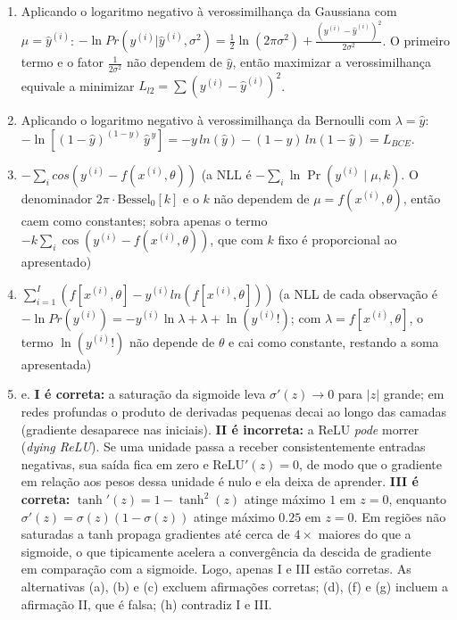 \documentclass{dlproblemset}
\begin{document}
\begin{enumerate}[1)]
    \item Aplicando o logaritmo negativo à verossimilhança da Gaussiana com $\mu = \hat{y}^{(i)}$: $-\ln Pr(y^{(i)}|\hat{y}^{(i)},\sigma^2) = \frac{1}{2}\ln(2\pi\sigma^2) + \frac{(y^{(i)}-\hat{y}^{(i)})^2}{2\sigma^2}$. O primeiro termo e o fator $\frac{1}{2\sigma^2}$ não dependem de $\hat{y}$, então maximizar a verossimilhança equivale a minimizar $L_{l2}=\sum\left(y^{(i)}-\hat{y}^{(i)}\right)^2$.

    \item Aplicando o logaritmo negativo à verossimilhança da Bernoulli com $\lambda = \hat{y}$: $-\ln\left[(1-\hat{y})^{(1-y)}\,\hat{y}^{\,y}\right] = -y\,ln(\hat{y})-(1-y)\,ln(1-\hat{y}) = L_{BCE}$.

    \item {} $-\sum_{i} cos(y^{(i)}-f(x^{(i)},\theta))$ \quad ({\footnotesize a NLL é $-\sum_i \ln \Pr(y^{(i)}\mid \mu, k)$. O denominador $2\pi \cdot \mathrm{Bessel}_0[k]$ e o $k$ não dependem de $\mu = f(x^{(i)},\theta)$, então caem como constantes; sobra apenas o termo $-k\sum_i \cos(y^{(i)} - f(x^{(i)},\theta))$, que com $k$ fixo é proporcional ao apresentado})

    \item {} $\sum _{i=1}^{I}(f[x^{(i)},\theta] - y^{(i)}ln(f[x^{(i)},\theta]))$ \quad ({\footnotesize a NLL de cada observação é $-\ln Pr(y^{(i)}) = -y^{(i)}\ln\lambda + \lambda + \ln(y^{(i)}!)$; com $\lambda = f[x^{(i)},\theta]$, o termo $\ln(y^{(i)}!)$ não depende de $\theta$ e cai como constante, restando a soma apresentada})

    \item e. \textbf{I é correta:} a saturação da sigmoide leva $\sigma'(z) \to 0$ para $|z|$ grande; em redes profundas o produto de derivadas pequenas decai ao longo das camadas (gradiente desaparece nas iniciais). \textbf{II é incorreta:} a ReLU \textit{pode} morrer (\textit{dying ReLU}). Se uma unidade passa a receber consistentemente entradas negativas, sua saída fica em zero e $\mathrm{ReLU}'(z) = 0$, de modo que o gradiente em relação aos pesos dessa unidade é nulo e ela deixa de aprender. \textbf{III é correta:} $\tanh'(z) = 1 - \tanh^2(z)$ atinge máximo $1$ em $z = 0$, enquanto $\sigma'(z) = \sigma(z)(1 - \sigma(z))$ atinge máximo $0.25$ em $z = 0$. Em regiões não saturadas a tanh propaga gradientes até cerca de $4\times$ maiores do que a sigmoide, o que tipicamente acelera a convergência da descida de gradiente em comparação com a sigmoide. Logo, apenas I e III estão corretas. As alternativas (a), (b) e (c) excluem afirmações corretas; (d), (f) e (g) incluem a afirmação II, que é falsa; (h) contradiz I e III.


\end{enumerate}
\end{document}

